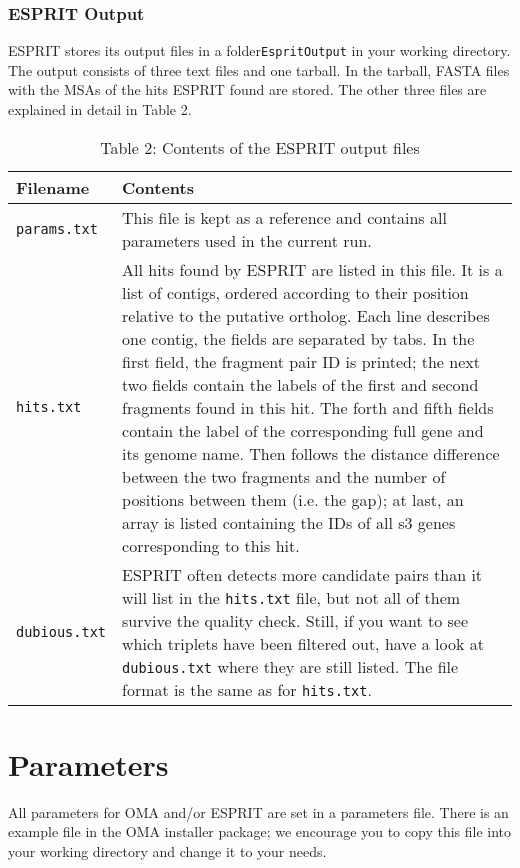 \documentclass{scrartcl}
\begin{document}
\subsubsection{ESPRIT Output}
\noindent ESPRIT stores its output files in a folder\texttt{EspritOutput} in your working directory. The output
            consists of three text files and one tarball. In the tarball,
            FASTA files with the MSAs of the hits ESPRIT found are stored.
             The other three files are explained in detail in Table 2.
\begin{table}[!ht]
\begin{tabular}{ l p{12cm} }
\textbf{Filename} & \textbf{Contents}\\
\hline
\texttt{params.txt} & 
\noindent This file is kept as a reference and 
                    contains all parameters used in the current run.
\\
\texttt{hits.txt} & 
\noindent All hits found by ESPRIT are listed in this
                    file. It is a list of contigs, ordered according to their
                    position relative to the putative ortholog. Each line 
                    describes one contig, the fields are separated by tabs.
                    In the first field, the fragment pair ID is printed; the
                    next two fields contain the labels of the first and
                    second fragments found in this hit. The forth and fifth 
                    fields contain the label of the corresponding full gene
                    and its genome name. Then follows the distance difference
                    between the two fragments and the number of positions
                    between them (i.e. the gap); at last, an array is listed
                    containing the IDs of all s3 genes corresponding to this
                    hit.
\\
\texttt{dubious.txt} & 
\noindent ESPRIT often detects more candidate pairs than
                    it will list in the \texttt{hits.txt} file, but not all
                    of them survive the quality check. Still, if you want to
                    see which triplets have been filtered out, have a look at \texttt{dubious.txt} where they are still listed. The file
                    format is the same as for \texttt{hits.txt}.
\\
\end{tabular}
\caption{Table 2: Contents of the ESPRIT output files}
\end{table}
\section{Parameters}
\noindent All parameters for OMA and/or ESPRIT are
                set in a parameters file. There is an example file in the
                OMA installer package; we encourage you to copy this file
                into your working directory and change it to your needs.
\end{document}
